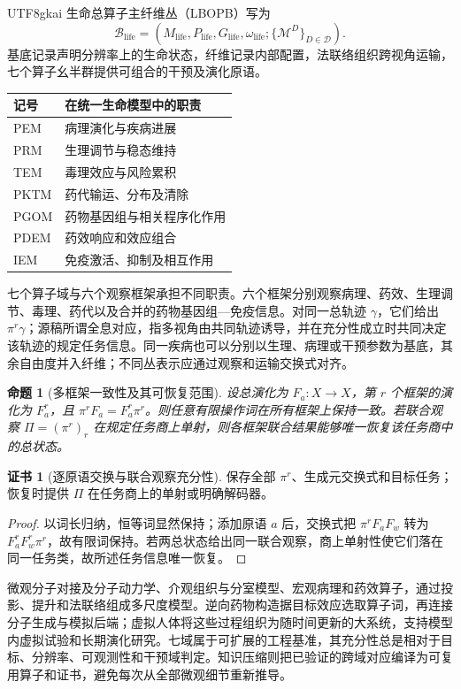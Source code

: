 \documentclass[11pt,a4paper]{article}
\theoremstyle{plain}
\newtheorem{proposition}[theorem]{命题}
\theoremstyle{definition}
\newtheorem*{certificate}{证书}
\theoremstyle{remark}
\begin{document}
\begin{CJK*}{UTF8}{gkai}
生命总算子主纤维丛（LBOPB）写为
\[
 \mathcal B_{\mathrm{life}}=
 (M_{\mathrm{life}},P_{\mathrm{life}},G_{\mathrm{life}},
 \omega_{\mathrm{life}};\{\mathcal M^D\}_{D\in\mathcal D}).
\]
基底记录声明分辨率上的生命状态，纤维记录内部配置，法联络组织跨视角运输，七个算子幺半群提供可组合的干预及演化原语。\cite{S03}

\begin{center}
\begin{tabular}{ll}
\hline
记号 & 在统一生命模型中的职责\\
\hline
PEM & 病理演化与疾病进展\\
PRM & 生理调节与稳态维持\\
TEM & 毒理效应与风险累积\\
PKTM & 药代输运、分布及清除\\
PGOM & 药物基因组与相关程序化作用\\
PDEM & 药效响应和效应组合\\
IEM & 免疫激活、抑制及相互作用\\
\hline
\end{tabular}
\end{center}

七个算子域与六个观察框架承担不同职责。六个框架分别观察病理、药效、生理调节、毒理、药代以及合并的药物基因组—免疫信息。对同一总轨迹 $\gamma$，它们给出 $\pi^r\gamma$；源稿所谓全息对应，指多视角由共同轨迹诱导，并在充分性成立时共同决定该轨迹的规定任务信息。同一疾病也可以分别以生理、病理或干预参数为基底，其余自由度并入纤维；不同丛表示应通过观察和运输交换式对齐。

\begin{proposition}[多框架一致性及其可恢复范围]
\label{fa:prop-multiview}
设总演化为 $F_a:X\to X$，第 $r$ 个框架的演化为 $F_a^r$，且 $\pi^rF_a=F_a^r\pi^r$。则任意有限操作词在所有框架上保持一致。若联合观察 $\Pi=(\pi^r)_r$ 在规定任务商上单射，则各框架联合结果能够唯一恢复该任务商中的总状态。
\end{proposition}
\begin{certificate}[逐原语交换与联合观察充分性]
保存全部 $\pi^r$、生成元交换式和目标任务；恢复时提供 $\Pi$ 在任务商上的单射或明确解码器。
\end{certificate}
\begin{proof}
以词长归纳，恒等词显然保持；添加原语 $a$ 后，交换式把 $\pi^rF_aF_w$ 转为 $F_a^rF_w^r\pi^r$，故有限词保持。若两总状态给出同一联合观察，商上单射性使它们落在同一任务类，故所述任务信息唯一恢复。
\end{proof}

微观分子对接及分子动力学、介观组织与分室模型、宏观病理和药效算子，通过投影、提升和法联络组成多尺度模型。逆向药物构造据目标效应选取算子词，再连接分子生成与模拟后端；虚拟人体将这些过程组织为随时间更新的大系统，支持模型内虚拟试验和长期演化研究。七域属于可扩展的工程基准，其充分性总是相对于目标、分辨率、可观测性和干预域判定。知识压缩则把已验证的跨域对应编译为可复用算子和证书，避免每次从全部微观细节重新推导。\cite{S03,S13}


\end{CJK*}
\end{document}
